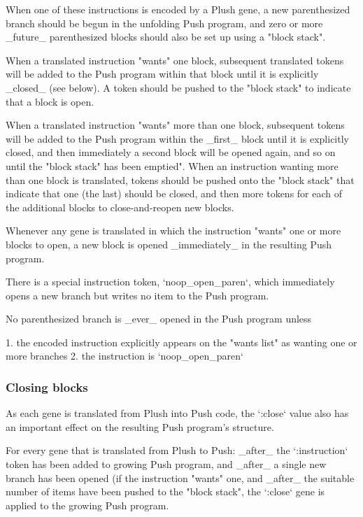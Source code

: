 When one of these instructions is encoded by a Plush gene, a new parenthesized branch should be begun in the unfolding Push program, and zero or more \_future\_ parenthesized blocks should also be set up using a "block stack".

When a translated instruction "wants" one block, subsequent translated tokens will be added to the Push program within that block until it is explicitly \_closed\_ (see below). A token should be pushed to the "block stack" to indicate that a block is open.

When a translated instruction "wants" more than one block, subsequent tokens will be added to the Push program within the \_first\_ block until it is explicitly closed, and then immediately a second block will be opened again, and so on until the "block stack" has been emptied". When an instruction wanting more than one block is translated, tokens should be pushed onto the "block stack" that indicate that one (the last) should be closed, and then more tokens for each of the additional blocks to close-and-reopen new blocks.

Whenever any gene is translated in which the instruction "wants" one or more blocks to open, a new block is opened \_immediately\_ in the resulting Push program.

There is a special instruction token, `noop\_open\_paren`, which immediately opens a new branch but writes no item to the Push program.

No parenthesized branch is \_ever\_ opened in the Push program unless

1. the encoded instruction explicitly appears on the "wants list" as wanting one or more branches
2. the instruction is `noop\_open\_paren`

\subsubsection{ Closing blocks}

As each gene is translated from Plush into Push code, the `:close` value also has an important effect on the resulting Push program's structure.

For every gene that is translated from Plush to Push: \_after\_ the `:instruction` token has been added to growing Push program, and \_after\_ a single new branch has been opened (if the instruction "wants" one, and \_after\_ the suitable number of items have been pushed to the "block stack", the `:close` gene is applied to the growing Push program.

